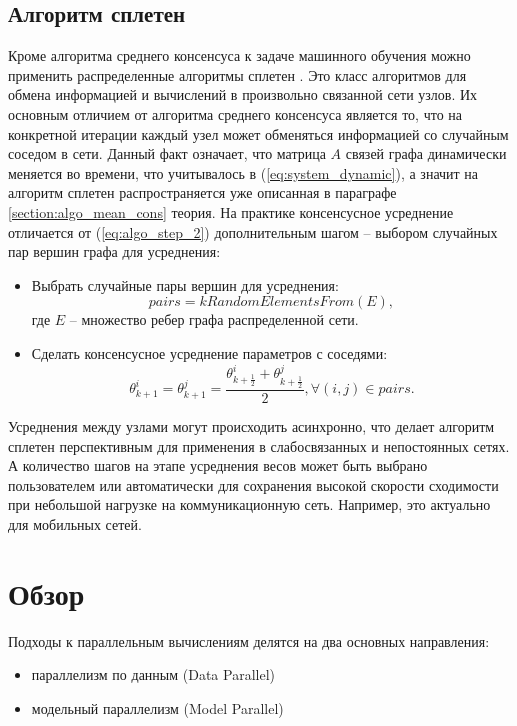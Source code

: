 \documentclass[a4paper,article,14pt]{extarticle}
\begin{document}
\subsection{Алгоритм сплетен}
Кроме алгоритма среднего консенсуса к задаче машинного обучения можно применить распределенные алгоритмы сплетен \cite{gossip}. Это класс алгоритмов для обмена информацией и вычислений в произвольно связанной сети узлов. Их основным отличием от алгоритма среднего консенсуса является то, что на конкретной итерации каждый узел может обменяться информацией со случайным соседом в сети. Данный факт означает, что матрица $A$ связей графа динамически меняется во времени, что учитывалось в (\ref{eq:system_dynamic}), а значит на алгоритм сплетен распространяется уже описанная в параграфе \ref{section:algo_mean_cons} теория. На практике консенсусное усреднение отличается от (\ref{eq:algo_step_2}) дополнительным шагом -- выбором случайных пар вершин графа для усреднения:
\begin{itemize}
\item
    Выбрать случайные пары вершин для усреднения:
    \begin{equation} \label{eq:algo_step_3}
    pairs = kRandomElementsFrom(E),
    \end{equation}
где $E$ -- множество ребер графа распределенной сети.

\item
    Сделать консенсусное усреднение параметров с соседями:
     \begin{equation} \label{eq:algo_step_4}
     \theta_{k+1}^i = \theta_{k+1}^j =
     \frac{\theta_{k+\frac{1}{2}}^i + \theta_{k+\frac{1}{2}}^j}{2}, \forall (i, j) \in pairs.
     \end{equation}
\end{itemize}

Усреднения между узлами могут происходить асинхронно, что делает алгоритм сплетен перспективным для применения в слабосвязанных и непостоянных сетях. А количество шагов на этапе усреднения весов может быть выбрано пользователем или автоматически для сохранения высокой скорости сходимости при небольшой нагрузке на коммуникационную сеть. Например, это актуально для мобильных сетей.


\pagebreak
\section{Обзор}
Подходы к параллельным вычислениям делятся на два основных направления:
\begin{itemize}
\item параллелизм по данным (Data Parallel)
\item модельный параллелизм (Model Parallel)
\end{itemize}
\end{document}
